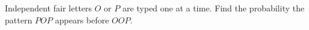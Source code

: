 Independent fair letters $O$ or $P$ are typed one at a time. Find the probability the pattern $POP$ appears before $OOP$.
